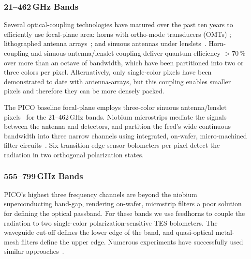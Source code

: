 \subsubsection{21--462\,GHz Bands}
\label{sec:low_freq_det} %

Several optical-coupling technologies have matured over the past ten years to efficiently use focal-plane area: horns with ortho-mode transducers (OMTs) \citep{Duff2016}; lithographed antenna arrays~\citep{BICEP2015}; and sinuous antennas under lenslets~\citep{Edwards2012}. Horn-coupling and sinuous antenna/lenslet-coupling deliver quantum efficiency $>70\,\%$ over more than an octave of bandwidth, which have been partitioned into two or three colors per pixel.  
Alternatively, only single-color pixels have been demonstrated to date with antenna-arrays, but this coupling enables smaller pixels and therefore they can be more densely packed.


The PICO baseline focal-plane employs three-color sinuous antenna/lenslet pixels~\citep{Suzuki2014} for the 21--462\,GHz bands. Niobium microstrips mediate the signals between the antenna and detectors, and partition the feed's wide continuous bandwidth into three narrow channels using integrated, on-wafer, micro-machined filter circuits~\citep{OBrient2013}. Six transition edge sensor bolometers per pixel detect the radiation in two orthogonal polarization states. %

\subsubsection{555--799\,GHz Bands}
\label{sec:high_freq_det} %
%

PICO's highest three frequency channels are beyond the niobium superconducting band-gap, rendering on-wafer, microstrip filters a poor solution for defining the optical passband. For these bands we use feedhorns to couple the radiation to two single-color polarization-sensitive TES bolometers. %
The waveguide cut-off defines the lower edge of the band, and quasi-optical metal-mesh filters define the upper edge. Numerous experiments have successfully used similar approaches~\citep{Shirokoff2011,Bleem2012,Turner2001}. 

